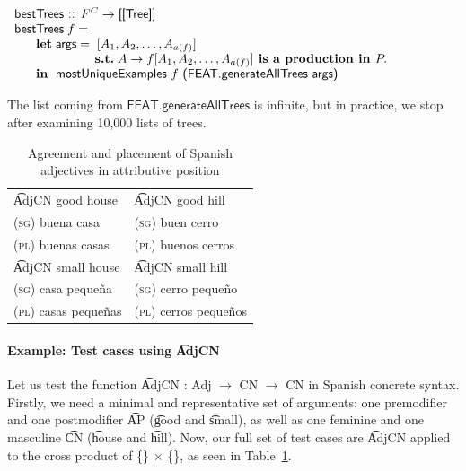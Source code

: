 \begin{EmptyItem}
$\begin{array}{p{0.25cm} p{0.2cm} p{0.75cm} l}
\multicolumn{4}{l}{\textsf{bestTrees :: } F^C \rightarrow \textsf{[[Tree]]}} \\
\multicolumn{4}{l}{\textsf{bestTrees} \; f =} \\
 & {\bf let} & \multicolumn{2}{l}{\textsf{args} = \; [A_1,A_2,\dots,A_{a(f)}]}  \\
 &    & &                             \textbf{s.t.} \;A \rightarrow
          f[A_1,A_2,\dots,A_{a(f)}] \textbf{ is a production in } P. \\
 &  {\bf in} & \multicolumn{2}{l}{\textsf{mostUniqueExamples } f
                   \textsf{ (FEAT.generateAllTrees args)}}
\end{array}$
\end{EmptyItem}


\noindent The list coming from $\textsf{FEAT.generateAllTrees}$ is infinite, but
in practice, we stop after examining 10,000 lists of trees.


\begin{table}[h]
\centering
\begin{tabular}{| l | l |}
\hline
\t{AdjCN good house}   & \t{AdjCN good hill} \\
\textsc{(sg)} buena casa            & \textsc{(sg)} buen cerro \\
\textsc{(pl)} buenas casas          & \textsc{(pl)} buenos cerros \\ \hline

\t{AdjCN small house}   & \t{AdjCN small hill} \\

\textsc{(sg)} casa peque\~{n}a            & \textsc{(sg)} cerro peque\~{n}o \\
\textsc{(pl)} casas peque\~{n}as          & \textsc{(pl)} cerros peque\~{n}os \\ \hline
\end{tabular}
\caption{Agreement and placement of Spanish adjectives in attributive position}
\label{tab:adjAttr}
\end{table}


\paragraph{Example: Test cases using \t{AdjCN}} Let us test the function
\t{AdjCN : Adj $\rightarrow$ CN $\rightarrow$ CN} in Spanish
concrete syntax.
Firstly, we need a minimal and representative set of arguments:
one premodifier and one postmodifier \t{AP} (\t{good} and
\t{small}), as well as one feminine and one masculine
\t{CN} (\t{house} and \t{hill}). Now, our full set of test cases are
\t{AdjCN} applied to the cross product of \{\} $\times$ \{\}, as seen in Table~\ref{tab:adjAttr}.


